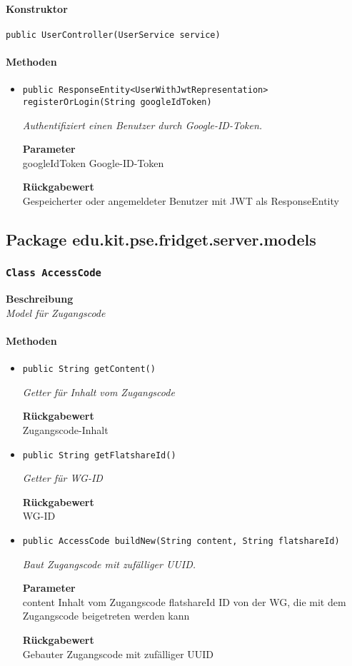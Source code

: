     \paragraph*{Konstruktor}
    \texttt{public UserController(UserService service)}
    \paragraph*{Methoden}
    \begin{itemize}
    	\item{\texttt{public ResponseEntity<UserWithJwtRepresentation> registerOrLogin(String googleIdToken)}}
    	
    	\textit{Authentifiziert einen Benutzer durch Google-ID-Token.}
    	
    	\textbf{Parameter} \\
    	googleIdToken Google-ID-Token
    	
    	\textbf{Rückgabewert} \\
    	Gespeicherter oder angemeldeter Benutzer mit JWT als ResponseEntity
    \end{itemize}
    \subsection{Package edu.kit.pse.fridget.server.models}
    \subsubsection{\texttt{Class AccessCode}}
    \textbf{Beschreibung} \\
    \textit{Model für Zugangscode}
    \paragraph*{Methoden}
    \begin{itemize}
    	\item{\texttt{public String getContent()}}
    	
    	\textit{Getter für Inhalt vom Zugangscode}
    	
    	
    	
    	\textbf{Rückgabewert} \\
    	Zugangscode-Inhalt        \item{\texttt{public String getFlatshareId()}}
    	
    	\textit{Getter für WG-ID}
    	
    	
    	
    	\textbf{Rückgabewert} \\
    	WG-ID        \item{\texttt{public AccessCode buildNew(String content, String flatshareId)}}
    	
    	\textit{Baut Zugangscode mit zufälliger UUID.}
    	
    	\textbf{Parameter} \\
    	content Inhalt vom Zugangscode
    	flatshareId ID von der WG, die mit dem Zugangscode beigetreten werden kann
    	
    	\textbf{Rückgabewert} \\
    	Gebauter Zugangscode mit zufälliger UUID
    \end{itemize}
